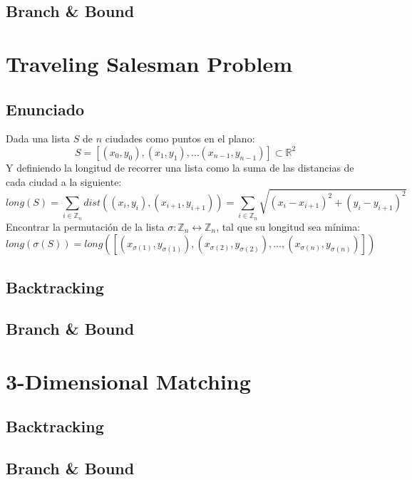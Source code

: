 \documentclass[a4paper, 11pt]{article} %
\begin{document}
\subsection{Branch \& Bound}


\section{Traveling Salesman Problem}
  \subsection{Enunciado}
    Dada una lista $S$ de $n$ ciudades como puntos en el plano:
    \begin{equation}
      S = [(x_0,y_0), (x_1,y_1), \dots (x_{n-1},y_{n-1})] \subset \mathbb{R}^2
    \end{equation}
    Y definiendo la longitud de recorrer una lista como la suma de las distancias de cada ciudad a la siguiente:
    \begin{equation}
     long(S) = \sum_{i \in \mathbb{Z}_n} dist((x_i,y_i), (x_{i+1}, y_{i+1})) = \sum_{i \in \mathbb{Z}_n} \sqrt{(x_i-x_{i+1})^2 + (y_i-y_{i+1})^2}
    \end{equation}
    Encontrar la permutación de la lista $\sigma : \mathbb{Z}_n \leftrightarrow \mathbb{Z}_n$, tal que su longitud sea mínima:
    \begin{equation}
     long(\sigma(S)) = long([(x_{\sigma(1)},y_{\sigma(1)}), (x_{\sigma(2)},y_{\sigma(2)}), \dots, (x_{\sigma(n)},y_{\sigma(n)})])
    \end{equation}
    
    \subsection{Backtracking}
    \subsection{Branch \& Bound}
    


\section{3-Dimensional Matching}
\subsection{Backtracking}
\subsection{Branch \& Bound}
\end{document}
